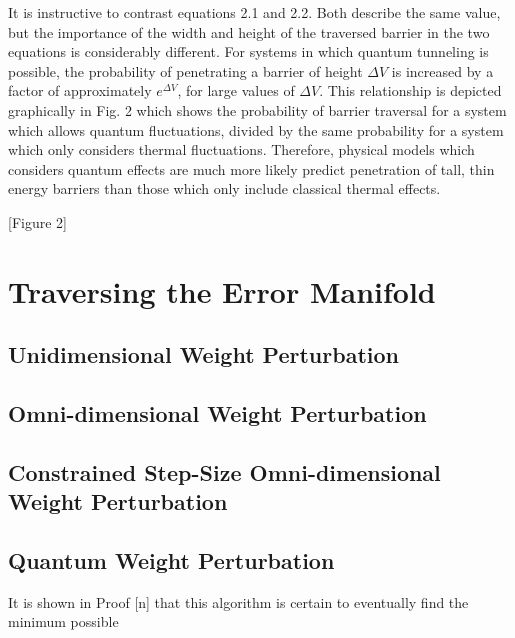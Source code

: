 \documentclass[11pt]{afthesis}
\begin{document}
It is instructive to contrast equations 2.1 and 2.2. Both describe the same value, but the importance of the width and height of the traversed barrier in the two equations is considerably different. For systems in which quantum tunneling is possible, the probability of penetrating a barrier of height \begin{math} \Delta V \end{math} is increased by a factor of approximately \begin{math} e^{\Delta V} \end{math}, for large values of \begin{math} \Delta V \end{math}. This relationship is depicted graphically in Fig. 2 which shows the probability of barrier traversal for a system which allows quantum fluctuations, divided by the same probability for a system which only considers thermal fluctuations. Therefore, physical models which considers quantum effects are much more likely predict penetration of tall, thin energy barriers than those which only include classical thermal effects.


[Figure 2] 


\section{Traversing the Error Manifold}

\subsection{Unidimensional Weight Perturbation}

\subsection{Omni-dimensional Weight Perturbation}

\subsection{Constrained Step-Size Omni-dimensional Weight Perturbation}

\subsection{Quantum Weight Perturbation}


It is shown in Proof [n] that this algorithm is certain to eventually find the minimum possible
\end{document}
